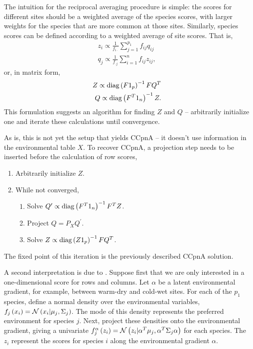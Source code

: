 \documentclass[utf8]{frontiersFPHY} %
\begin{document}
The intuition for the reciprocal averaging procedure is simple: the scores for
different sites should be a weighted average of the species scores, with larger
weights for the species that are more common at those sites. Similarly, species
scores can be defined according to a weighted average of site scores. That is,
\begin{align*}
  z_{i} \propto \frac{1}{f_{i\cdot}}\sum_{j = 1}^{p_{1}}f_{ij}q_{ij} \\ q_{j}
  \propto \frac{1}{f_{\cdot j}} \sum_{i = 1}^{n} f_{ij}z_{ij},
\end{align*}
or, in matrix form,
\begin{align*}
Z \propto \mathop\mathrm{diag}\left(F 1_{p}\right)^{-1} F Q^{T} \\ Q \propto \mathop\mathrm{diag}\left(F^{T}
1_{n}\right)^{-1} Z.
\end{align*}
This formulation suggests an algorithm for finding $Z$ and $Q$ -- arbitrarily
initialize one and iterate these calculations until convergence.

As is, this is not yet the setup that yields CCpnA -- it doesn't use information
in the environmental table $X$. To recover CCpnA, a projection step needs to be
inserted before the calculation of row scores,
\begin{enumerate}
\item Arbitrarily initialize $Z$.
\item While not converged,
\begin{enumerate}
\item Solve $Q^{\prime} \propto \mathop\mathrm{diag}\left(F^{T}1_{n}\right)^{-1}F^{T}Z$.
\item Project $Q = P_{X}Q^{\prime}$.
\item Solve $Z \propto \mathop\mathrm{diag}\left(Z 1_{p}\right)^{-1} F Q^{T}$.
\end{enumerate}
\end{enumerate}

The fixed point of this iteration is the previously described CCpnA solution.

A second interpretation is due to \cite{zhu2005constrained}. Suppose first that
we are only interested in a one-dimensional score for rows and columns. Let
$\alpha$ be a latent environmental gradient, for example, between warm-dry and
cold-wet sites. For each of the $p_{1}$ species, define a normal density over
the environmental variables, $f_{j}\left(x_{i}\right) = \mathcal{N}\left(x_i \vert
\mu_{j}, \Sigma_{j}\right)$. The mode of this density represents the preferred
environment for species $j$. Next, project these densities onto the
environmental gradient, giving a univariate $f_{j}^{\alpha}\left(z_{i}\right) =
\mathcal{N}\left(z_i \vert \alpha^{T}\mu_{j}, \alpha^{T} \Sigma_{j}\alpha\right)$ for
each species. The $z_{i}$ represent the scores for species $i$ along the
environmental gradient $\alpha$.
\end{document}
